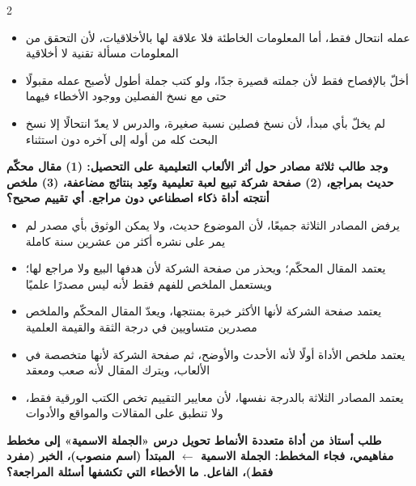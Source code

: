 \documentclass[10pt,a4paper]{article}
\begin{document}
\begin{multicols}{2}
\begin{minipage}{\linewidth}
\begin{itemize}[leftmargin=0.95cm, labelsep=4pt, itemsep=1pt, topsep=3pt, parsep=0pt]
  \item[\textbf{ج)}] عمله انتحال فقط، أما المعلومات الخاطئة فلا علاقة لها بالأخلاقيات، لأن التحقق من المعلومات مسألة تقنية لا أخلاقية
  \item[\textbf{د)}] أخلّ بالإفصاح فقط لأن جملته قصيرة جدًا، ولو كتب جملة أطول لأصبح عمله مقبولًا حتى مع نسخ الفصلين ووجود الأخطاء فيهما
  \item[\textbf{هـ)}] لم يخلّ بأي مبدأ، لأن نسخ فصلين نسبة صغيرة، والدرس لا يعدّ انتحالًا إلا نسخ البحث كله من أوله إلى آخره دون استثناء
\end{itemize}
\end{minipage}\par\vspace{8pt plus 6pt}
\noindent\begin{minipage}{\linewidth}
\hangindent=0.7cm\textbf{وجد طالب ثلاثة مصادر حول أثر الألعاب التعليمية على التحصيل: (1) مقال محكّم حديث بمراجع، (2) صفحة شركة تبيع لعبة تعليمية وتَعِد بنتائج مضاعفة، (3) ملخص أنتجته أداة ذكاء اصطناعي دون مراجع. أي تقييم صحيح؟}
\begin{itemize}[leftmargin=0.95cm, labelsep=4pt, itemsep=1pt, topsep=3pt, parsep=0pt]
  \item[\textbf{أ)}] يرفض المصادر الثلاثة جميعًا، لأن الموضوع حديث، ولا يمكن الوثوق بأي مصدر لم يمر على نشره أكثر من عشرين سنة كاملة
  \item[\textbf{ب)}] يعتمد المقال المحكّم؛ ويحذر من صفحة الشركة لأن هدفها البيع ولا مراجع لها؛ ويستعمل الملخص للفهم فقط لأنه ليس مصدرًا علميًا
  \item[\textbf{ج)}] يعتمد صفحة الشركة لأنها الأكثر خبرة بمنتجها، ويعدّ المقال المحكّم والملخص مصدرين متساويين في درجة الثقة والقيمة العلمية
  \item[\textbf{د)}] يعتمد ملخص الأداة أولًا لأنه الأحدث والأوضح، ثم صفحة الشركة لأنها متخصصة في الألعاب، ويترك المقال لأنه صعب ومعقد
  \item[\textbf{هـ)}] يعتمد المصادر الثلاثة بالدرجة نفسها، لأن معايير التقييم تخص الكتب الورقية فقط، ولا تنطبق على المقالات والمواقع والأدوات
\end{itemize}
\end{minipage}\par\vspace{8pt plus 6pt}
\noindent\begin{minipage}{\linewidth}
\hangindent=0.7cm\textbf{طلب أستاذ من أداة متعددة الأنماط تحويل درس «الجملة الاسمية» إلى مخطط مفاهيمي، فجاء المخطط: الجملة الاسمية $\leftarrow$ المبتدأ (اسم منصوب)، الخبر (مفرد فقط)، الفاعل. ما الأخطاء التي تكشفها أسئلة المراجعة؟}

\end{minipage}
\end{multicols}
\end{document}
